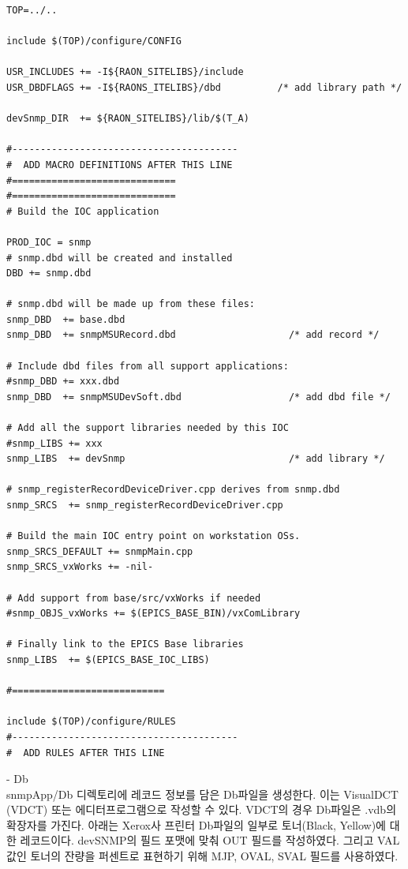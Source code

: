 \documentclass[11pt
  , a4paper
  , article
  , oneside
]{memoir}
\begin{document}
{\scriptsize
\begin{lstlisting}[style=termstylenumber]
TOP=../..

include $(TOP)/configure/CONFIG

USR_INCLUDES += -I${RAON_SITELIBS}/include
USR_DBDFLAGS += -I${RAONS_ITELIBS}/dbd          /* add library path */

devSnmp_DIR  += ${RAON_SITELIBS}/lib/$(T_A)

#----------------------------------------
#  ADD MACRO DEFINITIONS AFTER THIS LINE
#=============================
#=============================
# Build the IOC application

PROD_IOC = snmp
# snmp.dbd will be created and installed
DBD += snmp.dbd

# snmp.dbd will be made up from these files:
snmp_DBD  += base.dbd
snmp_DBD  += snmpMSURecord.dbd                    /* add record */

# Include dbd files from all support applications:
#snmp_DBD += xxx.dbd
snmp_DBD  += snmpMSUDevSoft.dbd                   /* add dbd file */

# Add all the support libraries needed by this IOC
#snmp_LIBS += xxx
snmp_LIBS  += devSnmp                             /* add library */

# snmp_registerRecordDeviceDriver.cpp derives from snmp.dbd
snmp_SRCS  += snmp_registerRecordDeviceDriver.cpp

# Build the main IOC entry point on workstation OSs.
snmp_SRCS_DEFAULT += snmpMain.cpp
snmp_SRCS_vxWorks += -nil-

# Add support from base/src/vxWorks if needed
#snmp_OBJS_vxWorks += $(EPICS_BASE_BIN)/vxComLibrary

# Finally link to the EPICS Base libraries
snmp_LIBS  += $(EPICS_BASE_IOC_LIBS)

#===========================

include $(TOP)/configure/RULES
#----------------------------------------
#  ADD RULES AFTER THIS LINE
\end{lstlisting}
}

\hfill

-­ Db\\
snmpApp/Db 디렉토리에 레코드 정보를 담은 Db파일을 생성한다. 이는 VisualDCT (VDCT) 또는 에디터프로그램으로 작성할 수 있다. VDCT의 경우 Db파일은 .vdb의 확장자를 가진다. 아래는 Xerox사 프린터 Db파일의 일부로 토너(Black, Yellow)에 대한 레코드이다. devSNMP의 필드 포맷에 맞춰 OUT 필드를 작성하였다. 그리고 VAL 값인 토너의 잔량을 퍼센트로 표현하기 위해 MJP, OVAL, SVAL 필드를 사용하였다. 
\end{document}
